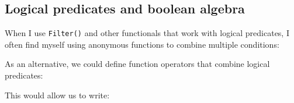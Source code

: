 \subsection{Logical predicates and boolean algebra}

When I use \texttt{Filter()} and other functionals that work with
logical predicates, I often find myself using anonymous functions to
combine multiple conditions: 

\begin{Shaded}
\begin{Highlighting}[]
\StringTok{ }
\end{Highlighting}
\end{Shaded}

As an alternative, we could define function operators that combine
logical predicates:

\begin{Shaded}
\begin{Highlighting}[]
\StringTok{ }
    \StringTok{ }
  \NormalTok{\}}
\NormalTok{\}}

\StringTok{ }
    \StringTok{ }
  \NormalTok{\}}
\NormalTok{\}}

\StringTok{ }
    \NormalTok{!}
  \NormalTok{\}}
\NormalTok{\}}
\end{Highlighting}
\end{Shaded}

This would allow us to write:

\begin{Shaded}
\begin{Highlighting}[]
\NormalTok{(}
\NormalTok{(}
\end{Highlighting}
\end{Shaded}

